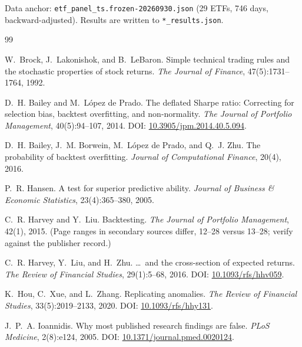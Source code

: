 \documentclass[11pt]{article}
\begin{document}
Data anchor: \texttt{etf\_panel\_ts.frozen-20260930.json} (29 ETFs, 746 days, backward-adjusted).
Results are written to \texttt{*\_results.json}.

\begin{thebibliography}{99}

W.~Brock, J.~Lakonishok, and B.~LeBaron.
\newblock Simple technical trading rules and the stochastic properties of stock returns.
\newblock \emph{The Journal of Finance}, 47(5):1731--1764, 1992.

D.~H. Bailey and M.~L\'opez de Prado.
\newblock The deflated Sharpe ratio: Correcting for selection bias, backtest overfitting, and
non-normality.
\newblock \emph{The Journal of Portfolio Management}, 40(5):94--107, 2014.
\newblock DOI: \href{https://doi.org/10.3905/jpm.2014.40.5.094}{10.3905/jpm.2014.40.5.094}.

D.~H. Bailey, J.~M. Borwein, M.~L\'opez de Prado, and Q.~J. Zhu.
\newblock The probability of backtest overfitting.
\newblock \emph{Journal of Computational Finance}, 20(4), 2016.

P.~R. Hansen.
\newblock A test for superior predictive ability.
\newblock \emph{Journal of Business \& Economic Statistics}, 23(4):365--380, 2005.

C.~R. Harvey and Y.~Liu.
\newblock Backtesting.
\newblock \emph{The Journal of Portfolio Management}, 42(1), 2015.
\newblock (Page ranges in secondary sources differ, 12--28 versus 13--28; verify against the
publisher record.)

C.~R. Harvey, Y.~Liu, and H.~Zhu.
\newblock \ldots\ and the cross-section of expected returns.
\newblock \emph{The Review of Financial Studies}, 29(1):5--68, 2016.
\newblock DOI: \href{https://doi.org/10.1093/rfs/hhv059}{10.1093/rfs/hhv059}.

K.~Hou, C.~Xue, and L.~Zhang.
\newblock Replicating anomalies.
\newblock \emph{The Review of Financial Studies}, 33(5):2019--2133, 2020.
\newblock DOI: \href{https://doi.org/10.1093/rfs/hhy131}{10.1093/rfs/hhy131}.

J.~P.~A. Ioannidis.
\newblock Why most published research findings are false.
\newblock \emph{PLoS Medicine}, 2(8):e124, 2005.
\newblock DOI: \href{https://doi.org/10.1371/journal.pmed.0020124}{10.1371/journal.pmed.0020124}.


\end{thebibliography}
\end{document}
